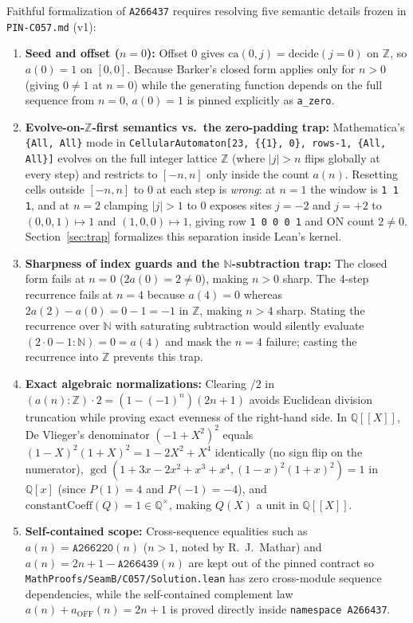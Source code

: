 \documentclass[11pt]{article}
\newcommand{\llbracket}{[\![}
\newcommand{\rrbracket}{]\!]}
\theoremstyle{definition}
\newcommand{\N}{\mathbb{N}}
\newcommand{\Z}{\mathbb{Z}}
\newcommand{\Q}{\mathbb{Q}}
\newcommand{\seq}[1]{\texttt{#1}}
\newcommand{\ca}{\mathrm{ca}}
\begin{document}
Faithful formalization of \seq{A266437} requires resolving five semantic details frozen in \texttt{PIN-C057.md} (v1):
\begin{enumerate}
\item \textbf{Seed and offset ($n = 0$):} Offset $0$ gives $\ca(0, j) = \mathrm{decide}(j = 0)$ on $\Z$, so $a(0) = 1$ on $[0, 0]$. Because Barker's closed form applies only for $n > 0$ (giving $0 \ne 1$ at $n = 0$) while the generating function depends on the full sequence from $n = 0$, $a(0) = 1$ is pinned explicitly as \texttt{a\_zero}.
\item \textbf{Evolve-on-$\Z$-first semantics vs.\ the zero-padding trap:} Mathematica's \texttt{\{All, All\}} mode in \texttt{CellularAutomaton[23, \{\{1\}, 0\}, rows-1, \{All, All\}]} evolves on the full integer lattice $\Z$ (where $|j| > n$ flips globally at every step) and restricts to $[-n, n]$ only inside the count $a(n)$. Resetting cells outside $[-n, n]$ to $0$ at each step is \emph{wrong}: at $n = 1$ the window is \texttt{1 1 1}, and at $n = 2$ clamping $|j| > 1$ to $0$ exposes sites $j = -2$ and $j = +2$ to $(0, 0, 1) \mapsto 1$ and $(1, 0, 0) \mapsto 1$, giving row \texttt{1 0 0 0 1} and ON count $2 \ne 0$. Section~\ref{sec:trap} formalizes this separation inside Lean's kernel.
\item \textbf{Sharpness of index guards and the $\N$-subtraction trap:} The closed form fails at $n = 0$ ($2a(0) = 2 \ne 0$), making $n > 0$ sharp. The $4$-step recurrence fails at $n = 4$ because $a(4) = 0$ whereas $2a(2) - a(0) = 0 - 1 = -1$ in $\Z$, making $n > 4$ sharp. Stating the recurrence over $\N$ with saturating subtraction would silently evaluate $(2 \cdot 0 - 1 : \N) = 0 = a(4)$ and mask the $n = 4$ failure; casting the recurrence into $\Z$ prevents this trap.
\item \textbf{Exact algebraic normalizations:} Clearing $/2$ in $(a(n) : \Z) \cdot 2 = (1 - (-1)^n)(2n + 1)$ avoids Euclidean division truncation while proving exact evenness of the right-hand side. In $\Q\llbracket X \rrbracket$, De Vlieger's denominator $(-1 + X^2)^2$ equals $(1 - X)^2(1 + X)^2 = 1 - 2X^2 + X^4$ identically (no sign flip on the numerator), $\gcd(1 + 3x - 2x^2 + x^3 + x^4, (1 - x)^2(1 + x)^2) = 1$ in $\Q[x]$ (since $P(1) = 4$ and $P(-1) = -4$), and $\mathrm{constantCoeff}(Q) = 1 \in \Q^\times$, making $Q(X)$ a unit in $\Q\llbracket X \rrbracket$.
\item \textbf{Self-contained scope:} Cross-sequence equalities such as $a(n) = \seq{A266220}(n)$ ($n > 1$, noted by R.~J.\ Mathar) and $a(n) = 2n + 1 - \seq{A266439}(n)$ are kept out of the pinned contract so \texttt{MathProofs/SeamB/C057/Solution.lean} has zero cross-module sequence dependencies, while the self-contained complement law $a(n) + a_{\mathrm{OFF}}(n) = 2n + 1$ is proved directly inside \texttt{namespace A266437}.
\end{enumerate}
\end{document}
